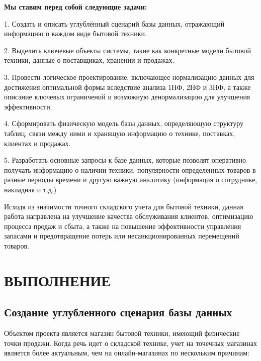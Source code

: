 \documentclass[14pt]{extreport}
\begin{document}
\textbf{Мы ставим перед собой следующие задачи: }


1. Создать и описать углублённый сценарий базы данных, отражающий информацию о каждом виде бытовой техники.


2. Выделить ключевые объекты системы, такие как конкретные модели бытовой техники, данные о поставщиках, хранении и продажах. 


3. Провести логическое проектирование, включающее нормализацию данных для достижения оптимальной формы вследствие анализа 1НФ, 2НФ и 3НФ, а также описание ключевых ограничений и возможную денормализацию для улучшения эффективности. 


4. Сформировать физическую модель базы данных, определяющую структуру таблиц, связи между ними и хранящую информацию о технике, поставках, клиентах и продажах. 


5. Разработать основные запросы к базе данных, которые позволят оперативно получать информацию о наличии техники, популярности определенных товаров в разные периоды времени и другую важную аналитику (информация о сотруднике, накладная и т.д.) 


Исходя из значимости точного складского учета для бытовой техники, данная работа направлена на улучшение качества обслуживания клиентов, оптимизацию процесса продаж и сбыта, а также на повышение эффективности управления запасами и предотвращение потерь или несанкционированных перемещений товаров.


\newpage
\chapter{ВЫПОЛНЕНИЕ}


\section{Создание углубленного сценария базы данных}

Объектом проекта является магазин бытовой техники, имеющий физические точки продажи. Когда речь идет о складской технике, учет на точечных магазинах является более актуальным, чем на онлайн-магазинах по нескольким причинам:
\end{document}
